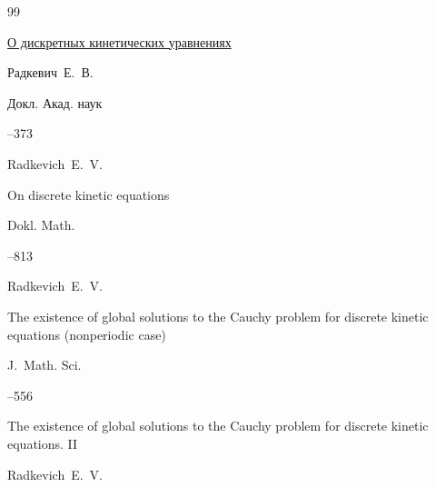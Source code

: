 \begin{thebibliography}{99}


\paper \href{https://elibrary.ru/item.asp?id=18447865}{О дискретных кинетических уравнениях}

\by Радкевич~Е.~В.

\jour Докл. Акад. наук




--373

\transl

\by Radkevich~E.~V.

\paper On discrete kinetic equations

\jour Dokl. Math.




--813










\by Radkevich~E.~V.

\paper The existence of global solutions to the Cauchy problem for discrete kinetic equations (nonperiodic case)

\jour J.~Math. Sci.




--556







\paper  The existence of global solutions to the Cauchy problem for discrete kinetic equations. II

\by Radkevich~E.~V.


\end{thebibliography}
